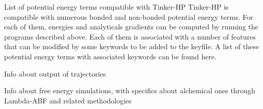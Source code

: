 \begin{DoxyItemize}
\item List of potential energy terms compatible with Tinker-\/\-H\-P Tinker-\/\-H\-P is compatible with numerous bonded and non-\/bonded potential energy terms. For each of them, energies and analyticals gradients can be computed by running the programs described above. Each of them is associated with a number of features that can be modified by some keywords to be added to the keyfile. A list of these potential energy terms with associated keywords can be found here.
\item Info about output of trajectories
\item Info about free energy simulations, with specifics about alchemical ones through Lambda-\/\-A\-B\-F and related methodologies 
\end{DoxyItemize}